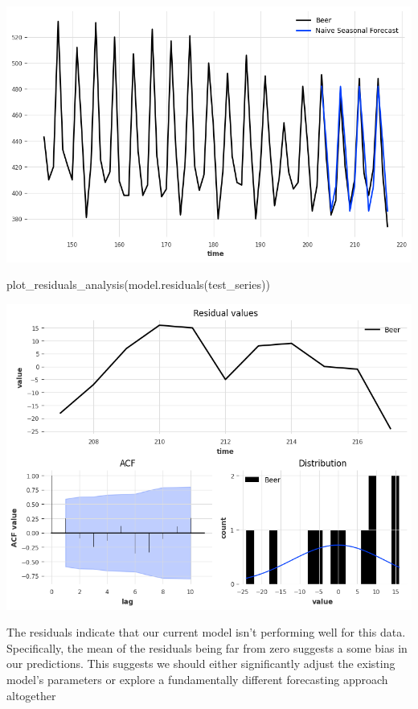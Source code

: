 \documentclass[
  11pt,
]{article}
\newenvironment{Shaded}{\begin{snugshade}}{\end{snugshade}}
\newcommand{\NormalTok}[1]{\textcolor[rgb]{0.00,0.23,0.31}{#1}}
\begin{document}
\includegraphics{hw3_files/figure-pdf/cell-36-output-1.png}

\begin{Shaded}
\begin{Highlighting}[]
\NormalTok{plot\_residuals\_analysis(model.residuals(test\_series))}
\end{Highlighting}
\end{Shaded}

\includegraphics{hw3_files/figure-pdf/cell-37-output-1.png}

The residuals indicate that our current model isn't performing well for
this data. Specifically, the mean of the residuals being far from zero
suggests a some bias in our predictions. This suggests we should either
significantly adjust the existing model's parameters or explore a
fundamentally different forecasting approach altogether
\end{document}
